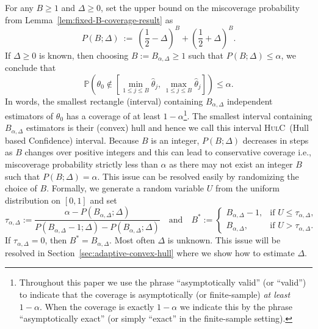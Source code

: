 \documentclass{article}
\newcommand{\hulc}{\textsc{HulC}~}
\numberwithin{myalgctr}{section}
\begin{document}
For any $B\ge1$ and $\Delta \ge 0$, set the {\color{black}upper bound on the} miscoverage probability from Lemma~\ref{lem:fixed-B-coverage-result} as
\begin{equation}\label{eq:miscoverage-function-B-Delta}
P(B; \Delta) ~:=~ \left(\frac{1}{2} - \Delta\right)^B + \left(\frac{1}{2} + \Delta\right)^B.
\end{equation} 
If $\Delta \ge 0$ is known, then choosing $B := B_{\alpha,\Delta}\ge1$ such that $P(B; \Delta) \le \alpha$, we conclude that
\[
\mathbb{P}\left(\theta_0 \notin \left[\min_{1\le j\le B}\widehat{\theta}_j,\,\max_{1\le j\le B}\widehat{\theta}_j\right]\right) \le \alpha.
\]
In words, the smallest rectangle (interval) containing $B_{\alpha,\Delta}$ independent estimators of $\theta_0$ has a coverage of at least $1 - \alpha$\footnote{{\color{black}Throughout this paper we use the phrase ``asymptotically valid'' (or ``valid'') to indicate that the coverage is asymptotically (or finite-sample) \emph{at least} $1 - \alpha$. When the coverage is exactly $1 - \alpha$ we indicate this by the phrase ``asymptotically exact'' (or simply ``exact'' in the finite-sample setting).}}. 
{\color{black}The smallest interval containing $B_{\alpha,\Delta}$ estimators is their (convex) hull and hence we call this interval \hulc (Hull based Confidence) interval.}
Because $B$ is an
integer, $P(B; \Delta)$ decreases in steps as $B$ changes over
positive integers and this can lead to conservative coverage {\color{black}i.e., miscoverage probability strictly less than $\alpha$ as there may not exist an integer $B$ such that $P(B; \Delta) = \alpha$}.  
This issue can be resolved easily by randomizing the choice of $B$. 
{\color{black}
Formally, we generate a random variable $U$ from the uniform distribution on $[0,1]$ and set
\begin{equation}\label{eq:definition-tau}
\tau_{\alpha,\Delta} := \frac{\alpha - P(B_{\alpha,\Delta}; \Delta)}{P(B_{\alpha,\Delta} - 1; \Delta) - P(B_{\alpha,\Delta};\Delta)}\quad\mbox{and}\quad B^* := \begin{cases} B_{\alpha,\Delta} - 1, &\mbox{if }U \le \tau_{\alpha,\Delta},\\
B_{\alpha,\Delta}, &\mbox{if }U > \tau_{\alpha,\Delta}.
\end{cases} 
\end{equation}
If $\tau_{\alpha,\Delta} = 0$, then $B^* = B_{\alpha,\Delta}$.
}
Most often $\Delta$ is unknown.  
This issue will be resolved 
in Section~\ref{sec:adaptive-convex-hull}
where we show how to estimate $\Delta$.
\end{document}
